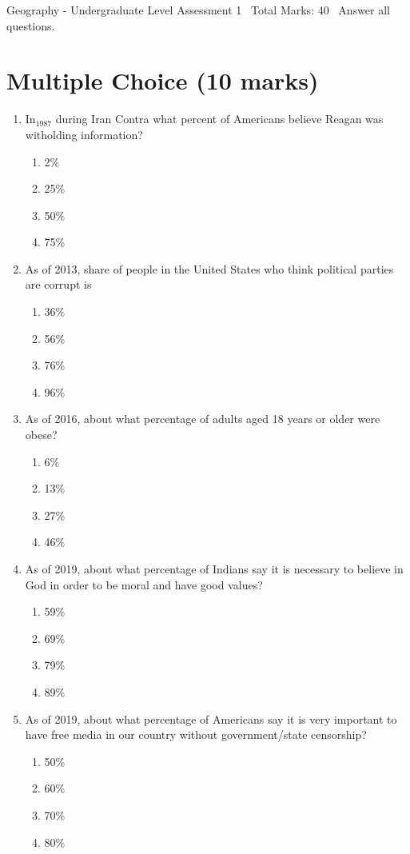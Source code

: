 \documentclass[12pt]{article}
\begin{document}
\begin{center}
Geography - Undergraduate Level Assessment 1 \
Total Marks: 40 \
Answer all questions.
\end{center}

\section*{Multiple Choice (10 marks)}
\begin{enumerate}[label=\arabic*.]
\item In$_{1987}$ during Iran Contra what percent of Americans believe Reagan was witholding information?
\begin{enumerate}[label=(\alph*)]
    \item 2\%
    \item 25\%
    \item 50\%
    \item 75\%
\end{enumerate}
\item As of 2013, share of people in the United States who think political parties are corrupt is
\begin{enumerate}[label=(\alph*)]
    \item 36\%
    \item 56\%
    \item 76\%
    \item 96\%
\end{enumerate}
\item As of 2016, about what percentage of adults aged 18 years or older were obese?
\begin{enumerate}[label=(\alph*)]
    \item 6\%
    \item 13\%
    \item 27\%
    \item 46\%
\end{enumerate}
\item As of 2019, about what percentage of Indians say it is necessary to believe in God in order to be moral and have good values?
\begin{enumerate}[label=(\alph*)]
    \item 59\%
    \item 69\%
    \item 79\%
    \item 89\%
\end{enumerate}
\item As of 2019, about what percentage of Americans say it is very important to have free media in our country without government/state censorship?
\begin{enumerate}[label=(\alph*)]
    \item 50\%
    \item 60\%
    \item 70\%
    \item 80\%
\end{enumerate}
\end{enumerate}
\end{document}
